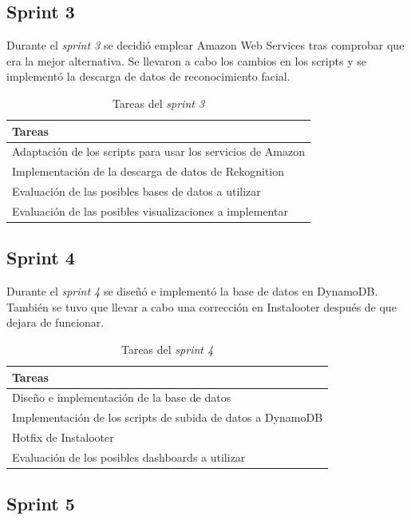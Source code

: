 \subsection{Sprint 3}
Durante el \textit{sprint 3} se decidió emplear Amazon Web Services tras comprobar que era la mejor alternativa. Se llevaron a cabo los cambios en los scripts y se implementó la descarga de datos de reconocimiento facial.

\begin{table}[H]
    \centering
    \begin{tabular}{l}
    \hline
    \textbf{Tareas} \\ \hline
    Adaptación de los scripts para usar los servicios de Amazon \\
    Implementación de la descarga de datos de Rekognition \\
    Evaluación de las posibles bases de datos a utilizar \\
    Evaluación de las posibles visualizaciones a implementar \\ \hline
    \end{tabular}
    \caption{Tareas del \textit{sprint 3}}
    \label{tab:tasks_sprint3}
\end{table}

\subsection{Sprint 4}

Durante el \textit{sprint 4} se diseñó e implementó la base de datos en DynamoDB. También se tuvo que llevar a cabo una corrección en Instalooter después de que dejara de funcionar.

\begin{table}[H]
    \centering
    \begin{tabular}{l}
    \hline
    \textbf{Tareas} \\ \hline
    Diseño e implementación de la base de datos \\
    Implementación de los scripts de subida de datos a DynamoDB \\
    Hotfix de Instalooter \\
    Evaluación de los posibles dashboards a utilizar \\ \hline
    \end{tabular}
    \caption{Tareas del \textit{sprint 4}}
    \label{tab:tasks_sprint4}
\end{table}

\subsection{Sprint 5}

